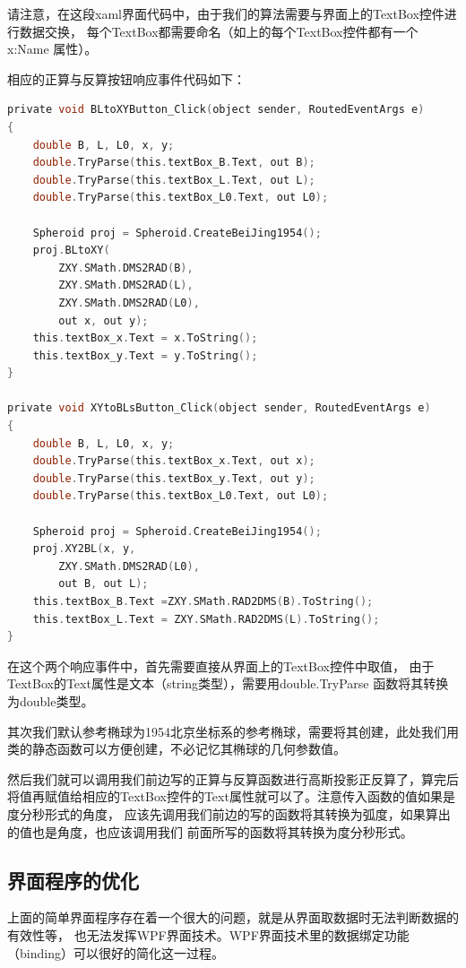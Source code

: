 请注意，在这段xaml界面代码中，由于我们的算法需要与界面上的TextBox控件进行数据交换，
每个TextBox都需要命名（如上的每个TextBox控件都有一个 x:Name 属性）。

相应的正算与反算按钮响应事件代码如下：

\begin{lstlisting}[language=C]
private void BLtoXYButton_Click(object sender, RoutedEventArgs e)
{
    double B, L, L0, x, y;
    double.TryParse(this.textBox_B.Text, out B);
    double.TryParse(this.textBox_L.Text, out L);
    double.TryParse(this.textBox_L0.Text, out L0);

    Spheroid proj = Spheroid.CreateBeiJing1954();
    proj.BLtoXY(
        ZXY.SMath.DMS2RAD(B),
        ZXY.SMath.DMS2RAD(L),
        ZXY.SMath.DMS2RAD(L0),
        out x, out y);
    this.textBox_x.Text = x.ToString();
    this.textBox_y.Text = y.ToString();
}

private void XYtoBLsButton_Click(object sender, RoutedEventArgs e)
{
    double B, L, L0, x, y;
    double.TryParse(this.textBox_x.Text, out x);
    double.TryParse(this.textBox_y.Text, out y);
    double.TryParse(this.textBox_L0.Text, out L0);

    Spheroid proj = Spheroid.CreateBeiJing1954();
    proj.XY2BL(x, y,
        ZXY.SMath.DMS2RAD(L0),
        out B, out L);
    this.textBox_B.Text =ZXY.SMath.RAD2DMS(B).ToString();
    this.textBox_L.Text = ZXY.SMath.RAD2DMS(L).ToString();
}
\end{lstlisting}

在这个两个响应事件中，首先需要直接从界面上的TextBox控件中取值，
由于TextBox的Text属性是文本（string类型），需要用double.TryParse
函数将其转换为double类型。

其次我们默认参考椭球为1954北京坐标系的参考椭球，需要将其创建，此处我们用
类的静态函数可以方便创建，不必记忆其椭球的几何参数值。

然后我们就可以调用我们前边写的正算与反算函数进行高斯投影正反算了，算完后
将值再赋值给相应的TextBox控件的Text属性就可以了。注意传入函数的值如果是度分秒形式的角度，
应该先调用我们前边的写的函数将其转换为弧度，如果算出的值也是角度，也应该调用我们
前面所写的函数将其转换为度分秒形式。


\subsection{界面程序的优化}
上面的简单界面程序存在着一个很大的问题，就是从界面取数据时无法判断数据的有效性等，
也无法发挥WPF界面技术。WPF界面技术里的数据绑定功能（binding）可以很好的简化这一过程。

